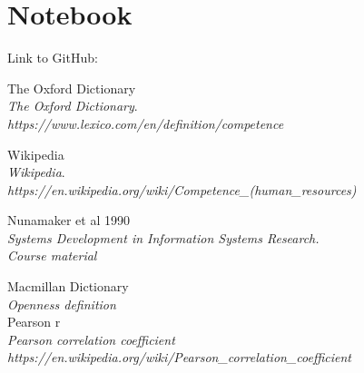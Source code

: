 \documentclass[twocolumn]{article}
\begin{document}
\section{Notebook}\label{section-applications}
Link to GitHub: 

\begin{thebibliography}{9}

 The Oxford Dictionary
\\\textit{The Oxford Dictionary}.  \\\textit{https://www.lexico.com/en/definition/competence}

 Wikipedia
\\\textit{Wikipedia}.
\\\textit{https://en.wikipedia.org/wiki/Competence_(human_resources)}

 Nunamaker et al 1990
\\\textit{Systems Development in Information Systems Research.}
\\\textit{Course material}

 Macmillan Dictionary
\\\textit{Openness definition}
\\\textit

 Pearson r
\\\textit{Pearson correlation coefficient}
\\\textit{https://en.wikipedia.org/wiki/Pearson_correlation_coefficient}

\end{thebibliography}
\end{document}

